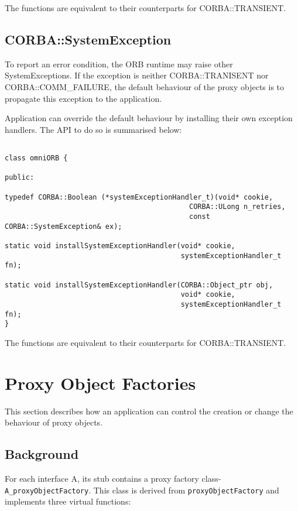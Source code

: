 \documentclass[11pt,twoside,onecolumn]{book}
\begin{document}
The functions are equivalent to their counterparts for CORBA::TRANSIENT. 



\subsection{CORBA::SystemException}


To report an error condition, the ORB runtime may raise other
SystemExceptions. If the exception is neither CORBA::TRANISENT nor
CORBA::COMM\_FAILURE, the default behaviour of the proxy objects is to
propagate this exception to the application.

Application can override the default behaviour by installing their own
exception handlers. The API to do so is summarised below:


{\small
\begin{verbatim}

class omniORB {

public:

typedef CORBA::Boolean (*systemExceptionHandler_t)(void* cookie,
                                            CORBA::ULong n_retries,
                                            const CORBA::SystemException& ex);

static void installSystemExceptionHandler(void* cookie,
                                          systemExceptionHandler_t fn);

static void installSystemExceptionHandler(CORBA::Object_ptr obj,
                                          void* cookie,
                                          systemExceptionHandler_t fn);
}
\end{verbatim}
}

The functions are equivalent to their counterparts for CORBA::TRANSIENT. 


\section{Proxy Object Factories}

This section describes how an application can control the creation or
change the behaviour of proxy objects.


\subsection{Background}

For each interface A, its stub contains a proxy factory class- {\tt
A\_proxyObjectFactory}. This class is derived from {\tt proxyObjectFactory}
and implements three virtual functions:
\end{document}
